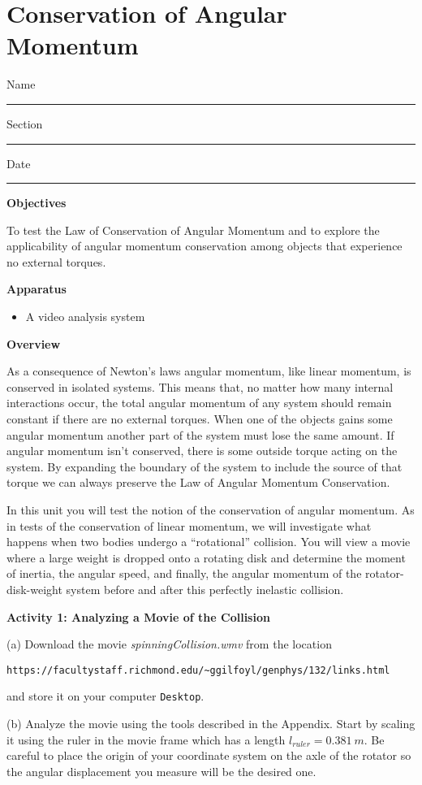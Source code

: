 
\section{Conservation of Angular Momentum}

Name \rule{2.0in}{0.1pt}\hfill{}Section \rule{1.0in}{0.1pt}\hfill{}Date \rule{1.0in}{0.1pt}

\textbf{Objectives} 

To test the Law of Conservation of Angular Momentum and to explore the applicability
of angular momentum conservation among objects that experience no external torques. 

\textbf{Apparatus}

\begin{itemize}
\item A video analysis system
\end{itemize}
\textbf{Overview }

As a consequence of Newton's laws angular momentum, like linear momentum, is
conserved in isolated systems. This means that, no matter how
many internal interactions occur, the total angular momentum of any system should 
remain constant if there are no external torques. 
When one of the objects gains some angular momentum another part of the system must lose the same amount. 
If angular momentum isn't conserved, there is some outside torque acting on the system. 
By expanding the boundary of the system to include the source of that torque we 
can always preserve the Law of Angular Momentum Conservation. 

In this unit you will test the notion of the conservation of angular momentum.
As in tests of the conservation of linear momentum, we will investigate what
happens when two bodies undergo a ``rotational'' collision.
You will view a movie where a large weight is dropped onto a rotating disk and determine the moment of
inertia, the angular speed, and finally, the angular momentum of the rotator-disk-weight
system before and after this perfectly inelastic collision.

\textbf{Activity 1: Analyzing a Movie of the Collision} 

(a) Download the movie {\it spinningCollision.wmv} from the location\raggedright

{\verb!https://facultystaff.richmond.edu/~ggilfoyl/genphys/132/links.html!}

\noindent and store it on your computer {\tt Desktop}.

(b) Analyze the movie using the tools described in the Appendix. Start by scaling it using 
the ruler in the movie frame which has a length $l_{ruler} = 0.381~m$.
Be careful to place the origin of your coordinate system on the axle of the
rotator so the angular displacement you measure will be the desired one.


